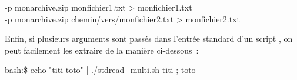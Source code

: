\begin{center}
\unzip -p monarchive.zip monfichier1.txt > monfichier1.txt\\
\unzip -p monarchive.zip chemin/vers/monfichier2.txt > monfichier2.txt
\end{center}

Enfin, si plusieurs arguments sont passés dans l'entrée standard d'un script \bash, on peut facilement les extraire de la manière ci-dessous~:\\

\cprotect{}

\begin{exempleResultat}
bash:\$ echo "titi toto" | ./stdread\_multi.sh 
titi ; toto
\end{exempleResultat}

\vfill
\newpage
